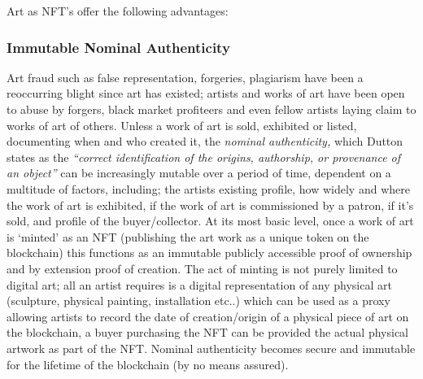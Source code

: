 Art as NFT's offer the following advantages:

\subsubsection{Immutable Nominal Authenticity} 
Art fraud such as false
  representation, forgeries, plagiarism have been a reoccurring blight
  since art has existed; artists and works of art have been open to
  abuse by forgers, black market profiteers and even fellow artists
  laying claim to works of art of others. Unless a work of art is sold,
  exhibited or listed, documenting when and who created it, the
  \emph{nominal authenticity,} which Dutton states as the
  \emph{``correct identification of the origins, authorship, or
  provenance of an object''} \cite{dutton2003authenticity} can be increasingly mutable over a period
  of time, dependent on a multitude of factors, including; the artists
  existing profile, how widely and where the work of art is exhibited,
  if the work of art is commissioned by a patron, if it's sold, and
  profile of the buyer/collector. At its most basic level, once a work
  of art is `minted' as an NFT (publishing the art work as a unique
  token on the blockchain) this functions as an immutable publicly
  accessible proof of ownership and by extension proof of creation. The
  act of minting is not purely limited to digital art; all an artist
  requires is a digital representation of any physical art (sculpture,
  physical painting, installation etc..) which can be used as a proxy
  allowing artists to record the date of creation/origin of a physical
  piece of art on the blockchain, a buyer purchasing the NFT can be
  provided the actual physical artwork as part of the NFT. Nominal
  authenticity becomes secure and immutable for the lifetime of the blockchain (by no means assured).

